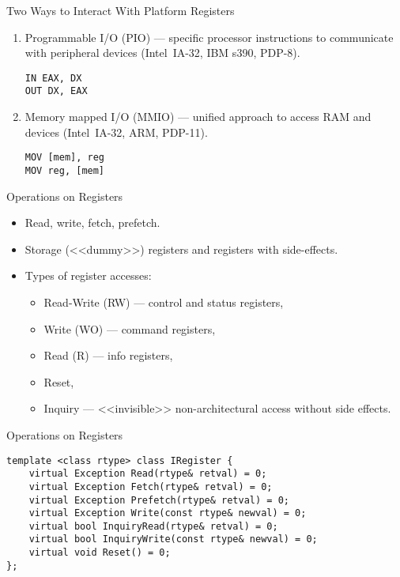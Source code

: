 \begin{frame}[fragile]{Two Ways to Interact With Platform Registers}
\begin{enumerate}
\item
Programmable I/O (PIO) --- specific processor instructions to communicate with
peripheral devices (Intel\reg~IA-32, IBM s390, PDP-8).
\vfill
\begin{verbatim}
IN EAX, DX
OUT DX, EAX
\end{verbatim}
\vfill\pause
\item
Memory mapped I/O (MMIO) --- unified approach to access RAM and devices
(Intel\reg~IA-32, ARM, PDP-11).
\vfill
\begin{verbatim}
MOV [mem], reg
MOV reg, [mem]
\end{verbatim}
\end{enumerate}
\end{frame}

\begin{frame}{Operations on Registers}
\begin{itemize}
\item Read, write, fetch, prefetch.
\item Storage (<<dummy>>) registers and registers with side-effects.
\item Types of register accesses:
\begin{itemize}
\item Read-Write (RW) --- control and status registers,
\item Write (WO) --- command registers,
\item Read (R) --- info registers,
\item Reset,
\item Inquiry --- <<invisible>> non-architectural access without side effects.
\end{itemize}
\end{itemize}
\end{frame}

\begin{frame}[fragile]{Operations on Registers}
\begin{lstlisting}[basicstyle=\small]
template <class rtype> class IRegister {
    virtual Exception Read(rtype& retval) = 0;
    virtual Exception Fetch(rtype& retval) = 0;
    virtual Exception Prefetch(rtype& retval) = 0;
    virtual Exception Write(const rtype& newval) = 0;
    virtual bool InquiryRead(rtype& retval) = 0;
    virtual bool InquiryWrite(const rtype& newval) = 0;
    virtual void Reset() = 0;
};
\end{lstlisting}
\end{frame}

